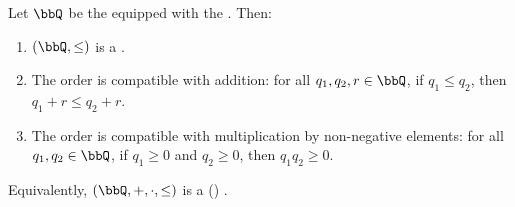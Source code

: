 \begin{proposition} \label{proposition:the_field_of_rational_numbers_is_a_totally_ordered_field}
    Let $\bbQ$ be the  equipped with the . Then:
    \begin{enumerate}
        \item $(\bbQ, \le)$ is a .
        \item The order is compatible with addition: for all $q_1,q_2,r \in \bbQ$, if $q_1 \le q_2$, then $q_1 + r \le q_2 + r$.
        \item The order is compatible with multiplication by non-negative elements: for all $q_1,q_2 \in \bbQ$, if $q_1 \ge 0$ and $q_2 \ge 0$, then $q_1 q_2 \ge 0$.
    \end{enumerate}
    Equivalently, $(\bbQ, +, \cdot, \le)$ is a () .
\end{proposition}


